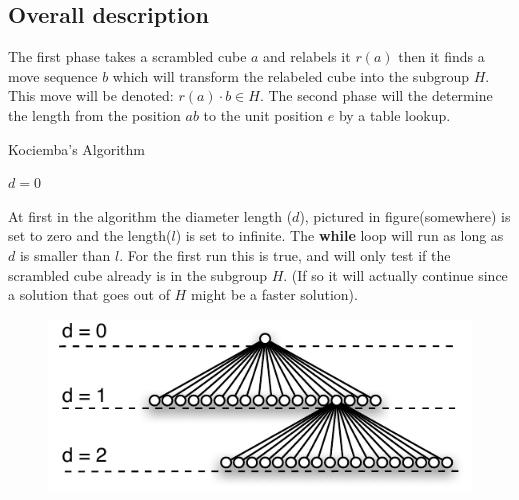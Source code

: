 \subsection{Overall description}
\label{sub:overallDescription}
The first phase takes a scrambled cube $a$ and relabels it $r(a)$ then it finds a move sequence $b$ which will transform the relabeled cube into the subgroup $H$. This move will be denoted: $r(a)\cdot{}b \in H$. The second phase will the determine the length from the position $ab$ to the unit position $e$ by a table lookup. 


\begin{algorithm}                     
\caption{Kociemba's Algorithm \cite{rokicki09}}          
\label{alg:kociemba}        
\begin{algorithmic}[1]
\STATE $d=0$
			\ENDIF
		\ENDIF
	\ENDFOR
\ENDWHILE
\end{algorithmic}
\end{algorithm}

At first in the algorithm the diameter length ($d$), pictured in figure(somewhere) is set to zero and the length($l$) is set to infinite. The \textbf{while} loop will run as long as $d$ is smaller than $l$. For the first run this is true, and will only test if the scrambled cube already is in the subgroup $H$. (If so it will actually continue since a solution that goes out of $H$ might be a faster solution). 

\begin{figure}[hb]
	\centering
		\includegraphics{input/pics/searchExpansion.pdf}
	\caption{}
	\label{fig:searchExpansion}
\end{figure}

